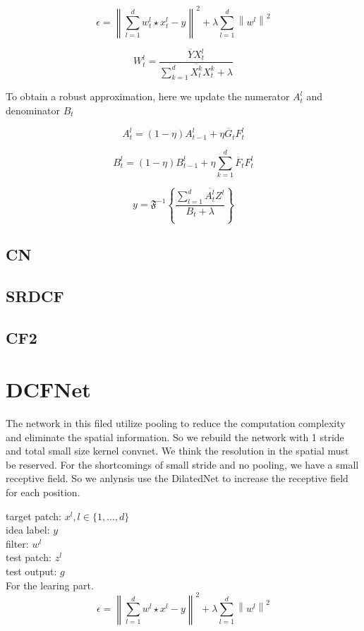 \documentclass[11pt]{article}
\begin{document}
$$
\epsilon = \left \| \sum_{l=1}^{d} w_t^l\star x_t^l-y \right \|^{2} +\lambda \sum_{l=1}^{d}\left\|w^l \right\|^{2}
$$

$$
W_t^l=\frac{\overline{Y}X_t^l}{\sum_{k=1}^{d}\overline{X_t^k}X_t^k+\lambda}
$$


To obtain a robust approximation, here we update the numerator $A_ {t}^{l} $ and denominator $ B_{t} $

$$
A_{t}^{l} = (1-\eta )A_{t-1}^{l}+\eta \overline{G}_{t}F_{t}^{l}
$$

$$
B_{t}^{l} = (1-\eta )B_{t-1}^{l}+\eta \sum_{k=1}^{d}\overline{F}_{t}F_{t}^{l}
$$

$$
y=\mathfrak{F}^{-1}\left\{ \frac{\sum_{l=1}^{d}\overline{A_t^{l}}Z^{l}}{B_t+\lambda}\right\}
$$


	\subsection{CN}

	\subsection{SRDCF}
	\subsection{CF2}
	
	\section{DCFNet}
	
 The network in this filed utilize pooling to reduce the computation complexity and eliminate the spatial information.
 So we rebuild the network with 1 stride and total small size kernel convnet. We think the resolution in the spatial must be reserved. For the shortcomings of small stride and no  pooling, we have a small receptive field. So we anlynsis use the DilatedNet to increase the receptive field for each position.
	
	
target patch: $ x^{l} ,l\in \{ 1,...,d \} $ \\
idea label: $ y $ \\
filter: $ w^{l} $ \\
test patch: $ z^{l} $ \\
test output: $ g $ \\

For the learing part.
$$
\epsilon =  \left \| \sum_{l=1}^{d} w^{l}\star x^{l}-y \right \|^{2} +\lambda \sum_{l=1}^{d}\left\|w^{l} \right\|^{2}
$$
\end{document}
